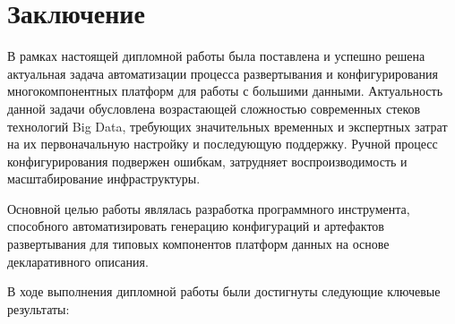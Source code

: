 \chapter*{Заключение} \label{ch-conclusion}
В рамках настоящей дипломной работы была поставлена и успешно решена актуальная задача автоматизации процесса развертывания и конфигурирования многокомпонентных платформ для работы с большими данными. Актуальность данной задачи обусловлена возрастающей сложностью современных стеков технологий Big Data, требующих значительных временных и экспертных затрат на их первоначальную настройку и последующую поддержку. Ручной процесс конфигурирования подвержен ошибкам, затрудняет воспроизводимость и масштабирование инфраструктуры.

Основной целью работы являлась разработка программного инструмента, способного автоматизировать генерацию конфигураций и артефактов развертывания для типовых компонентов платформ данных на основе декларативного описания.

В ходе выполнения дипломной работы были достигнуты следующие ключевые результаты:

